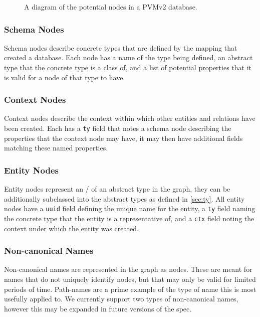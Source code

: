 \documentclass[12pt,twoside,a4paper]{article}
\newcommand{\field}[1]{\texttt{#1}}
\begin{document}
\begin{figure}[h]
\centering

\caption{A diagram of the potential nodes in a PVMv2 database.}
\label{fig:nodes}
\end{figure}

\subsubsection{Schema Nodes}
\label{sec:gs:node:schema}
Schema nodes describe concrete types that are defined by the mapping that created a database. Each node has a name of the type being defined, an abstract type that the concrete type is a class of, and a list of potential properties that it is valid for a node of that type to have.

\subsubsection{Context Nodes}
\label{sec:gs:node:context}
Context nodes describe the context within which other entities and relations have been created. Each has a \field{ty} field that notes a schema node describing the properties that the context node may have, it may then have additional fields matching these named properties.

\subsubsection{Entity Nodes}
\label{sec:gs:node:entity}
Entity nodes represent an \Entity/ of an abstract type in the graph, they can be additionally subclassed into the abstract types as defined in \autoref{sec:ty}. All entity nodes have a \field{uuid} field defining the unique name for the entity, a \field{ty} field naming the concrete type that the entity is a representative of, and a \field{ctx} field noting the context under which the entity was created.

\subsubsection{Non-canonical Names}
\label{sec:gs:node:name}
Non-canonical names are represented in the graph as nodes. These are meant for names that do not uniquely identify nodes, but that may only be valid for limited periods of time. Path-names are a prime example of the type of name this is most usefully applied to. We currently support two types of non-canonical names, however this may be expanded in future versions of the spec.
\end{document}
